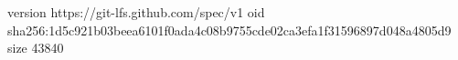 version https://git-lfs.github.com/spec/v1
oid sha256:1d5c921b03beea6101f0ada4c08b9755cde02ca3efa1f31596897d048a4805d9
size 43840
